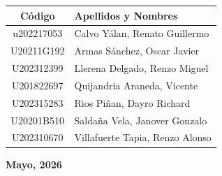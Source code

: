 \begin{titlepage}
  \begin{center}
    \begin{tabular}{|c|l|}
      \hline
      \textbf{Código} & \textbf{Apellidos y Nombres} \\
      \hline
      u202217053 & Calvo Yálan, Renato Guillermo \\
      U20211G192 & Armas Sánchez, Oscar Javier \\
      U202312399 & Llerena Delgado, Renzo Miguel \\
      U201822697 & Quijandria Araneda, Vicente \\
      U202315283 & Rios Piñan, Dayro Richard \\
      U20201B510 & Saldaña Vela, Janover Gonzalo \\
      U202310670 & Villafuerte Tapia, Renzo Alonso \\
      \hline
    \end{tabular}
  \end{center}

  \vfill
  {\normalsize\bfseries Mayo, 2026\par}
\end{titlepage}